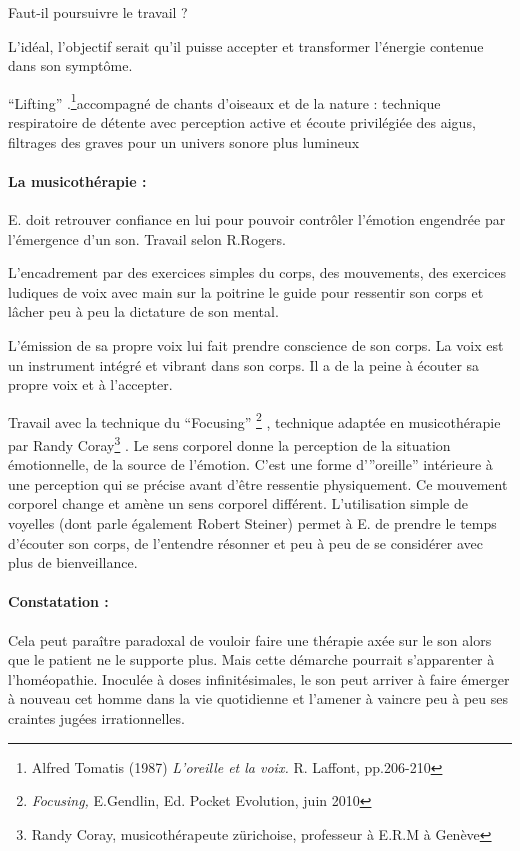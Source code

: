 Faut-il poursuivre le travail ?

L'idéal, l'objectif serait qu'il puisse accepter et  transformer l'énergie
contenue dans son symptôme.

``Lifting'' .\footnote{Alfred Tomatis (1987) \emph{L'oreille et la voix. }R. Laffont, pp.206-210 }accompagné
de chants d'oiseaux et de la nature : technique respiratoire de détente
avec perception active et écoute privilégiée des aigus, filtrages
des graves pour un univers sonore plus lumineux

\paragraph{La musicothérapie : }

E. doit retrouver confiance en lui pour pouvoir contrôler l'émotion
engendrée par l'émergence d'un son. Travail selon R.Rogers. 

L'encadrement par des exercices simples du corps, des mouvements,
des exercices ludiques de voix avec main sur la poitrine le guide
pour ressentir son corps et lâcher peu à peu la dictature de son mental.

L'émission de sa propre voix lui fait prendre conscience de son corps.
La voix est un instrument intégré et vibrant dans son corps. Il a
de la peine à écouter sa propre voix et à l'accepter.

Travail avec la technique du ``Focusing'' \footnote{\emph{Focusing, }E.Gendlin, Ed. Pocket Evolution, juin 2010 }
, technique adaptée en musicothérapie par Randy Coray\footnote{Randy Coray, musicothérapeute zürichoise, professeur à E.R.M à Genève}
. Le sens corporel donne la perception de la situation émotionnelle,
de la source de l'émotion. C'est une forme d'{}''oreille'' intérieure
à une perception qui se précise avant d'être ressentie physiquement.
Ce mouvement corporel change et amène un sens corporel différent.
L'utilisation simple de voyelles (dont parle également Robert Steiner)
permet à E. de prendre le temps d'écouter son corps, de l'entendre
résonner et peu à peu de se considérer avec plus de bienveillance.

\paragraph{Constatation : }

Cela peut paraître paradoxal de vouloir faire une thérapie axée sur
le son alors que le patient ne le supporte plus. Mais cette démarche
pourrait s'apparenter à l'homéopathie. Inoculée à doses infinitésimales,
le son peut arriver à faire émerger à nouveau cet homme dans la vie
quotidienne et l'amener à vaincre peu à peu ses craintes jugées irrationnelles.

